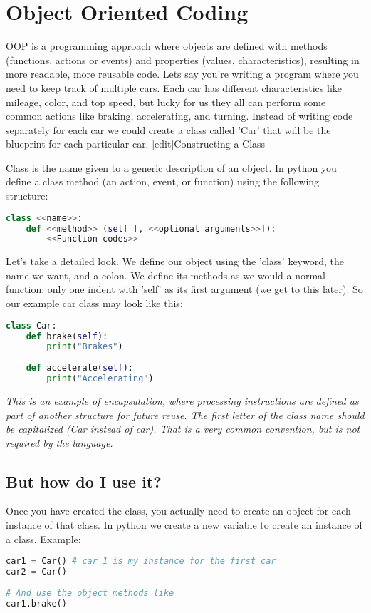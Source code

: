 \section{Object Oriented Coding}
OOP is a programming approach where objects are defined with methods (functions,
actions or events) and properties (values, characteristics), resulting in more
readable, more reusable code.  Lets say you're writing a program where you need
to keep track of multiple cars. Each car has different characteristics like
mileage, color, and top speed, but lucky for us they all can perform some common
actions like braking, accelerating, and turning.  Instead of writing code
separately for each car we could create a class called 'Car' that will be the
blueprint for each particular car.  [edit]Constructing a Class

Class is the name given to a generic description of an object. In python you
define a class method (an action, event, or function) using the following
structure:
\lstset{basicstyle=\scriptsize, numbers=left, captionpos=b, tabsize=4}
\begin{lstlisting}[caption=Basic Class Definition,language={Python},
xleftmargin=15pt, label=lst:basicclassdefinition]
class <<name>>:
    def <<method>> (self [, <<optional arguments>>]):
        <<Function codes>>
\end{lstlisting}

Let's take a detailed look. We define our object using the 'class' keyword, the
name we want, and a colon. We define its methods as we would a normal function:
only one indent with 'self' as its first argument (we get to this later). So our
example car class may look like this:
\lstset{basicstyle=\scriptsize, numbers=left, captionpos=b, tabsize=4}
\begin{lstlisting}[caption=Example Class Car,language={Python},
xleftmargin=15pt, label=lst:exampleclasscar]
class Car:
    def brake(self):
        print("Brakes")
 
    def accelerate(self):
        print("Accelerating")
\end{lstlisting}

\textit{This is an example of encapsulation, where processing instructions are defined
as part of another structure for future reuse.
The first letter of the class name should be capitalized (Car instead of car).
That is a very common convention, but is not required by the language.}

\subsection{But how do I use it?}
Once you have created the class, you actually need to create an object for each
instance of that class. In python we create a new variable to create an instance
of a class. Example:
\lstset{basicstyle=\scriptsize, numbers=left, captionpos=b, tabsize=4}
\begin{lstlisting}[caption=Class usage,language={Python},
xleftmargin=15pt, label=lst:classusage]
car1 = Car() # car 1 is my instance for the first car
car2 = Car()
 
# And use the object methods like
car1.brake()
\end{lstlisting}

